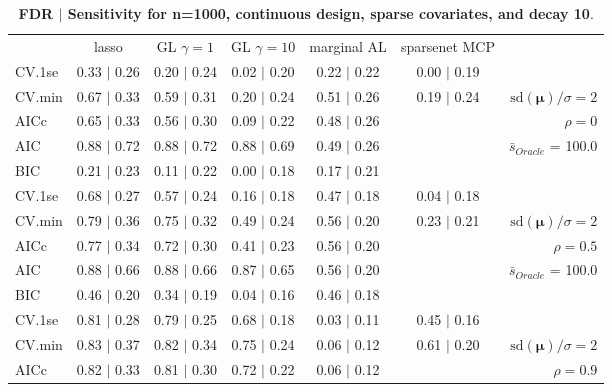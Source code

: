 \clearpage
\begin{table}\vspace{-.5cm}
\caption[l]{ {\it }
{ \bf FDR $\boldsymbol{\mid}$ Sensitivity for n=1000, continuous design, sparse covariates, and  decay  10}.}
\vspace{-.5cm}
\footnotesize{}
\begin{center}
\begin{tabular}{l*{5}{c}|r}
 & lasso & GL $\gamma=1$ & GL $\gamma=10$ & marginal AL & sparsenet MCP  & \\
 \cline{1-7}
CV.1se & 0.33 $\mid$ 0.26 & 0.20 $\mid$ 0.24 & 0.02 $\mid$ 0.20 & 0.22 $\mid$ 0.22 & 0.00 $\mid$ 0.19 & \\
CV.min & 0.67 $\mid$ 0.33 & 0.59 $\mid$ 0.31 & 0.20 $\mid$ 0.24 & 0.51 $\mid$ 0.26 & 0.19 $\mid$ 0.24 &  $\mathrm{sd}(\mathbf{\mu})/\sigma=2$ \\
AICc & 0.65 $\mid$ 0.33 & 0.56 $\mid$ 0.30 & 0.09 $\mid$ 0.22 & 0.48 $\mid$ 0.26 & & $\rho=0$ \\
AIC & 0.88 $\mid$ 0.72 & 0.88 $\mid$ 0.72 & 0.88 $\mid$ 0.69 & 0.49 $\mid$ 0.26 & &  \multirow{2}{*}{$\bar{s}_{Oracle}$ = 100.0} \\
BIC & 0.21 $\mid$ 0.23 & 0.11 $\mid$ 0.22 & 0.00 $\mid$ 0.18 & 0.17 $\mid$ 0.21 & &  \\
 \hline 
CV.1se & 0.68 $\mid$ 0.27 & 0.57 $\mid$ 0.24 & 0.16 $\mid$ 0.18 & 0.47 $\mid$ 0.18 & 0.04 $\mid$ 0.18 & \\
CV.min & 0.79 $\mid$ 0.36 & 0.75 $\mid$ 0.32 & 0.49 $\mid$ 0.24 & 0.56 $\mid$ 0.20 & 0.23 $\mid$ 0.21 &  $\mathrm{sd}(\mathbf{\mu})/\sigma=2$ \\
AICc & 0.77 $\mid$ 0.34 & 0.72 $\mid$ 0.30 & 0.41 $\mid$ 0.23 & 0.56 $\mid$ 0.20 & & $\rho=0.5$ \\
AIC & 0.88 $\mid$ 0.66 & 0.88 $\mid$ 0.66 & 0.87 $\mid$ 0.65 & 0.56 $\mid$ 0.20 & &  \multirow{2}{*}{$\bar{s}_{Oracle}$ = 100.0} \\
BIC & 0.46 $\mid$ 0.20 & 0.34 $\mid$ 0.19 & 0.04 $\mid$ 0.16 & 0.46 $\mid$ 0.18 & &  \\
 \hline 
CV.1se & 0.81 $\mid$ 0.28 & 0.79 $\mid$ 0.25 & 0.68 $\mid$ 0.18 & 0.03 $\mid$ 0.11 & 0.45 $\mid$ 0.16 & \\
CV.min & 0.83 $\mid$ 0.37 & 0.82 $\mid$ 0.34 & 0.75 $\mid$ 0.24 & 0.06 $\mid$ 0.12 & 0.61 $\mid$ 0.20 &  $\mathrm{sd}(\mathbf{\mu})/\sigma=2$ \\
AICc & 0.82 $\mid$ 0.33 & 0.81 $\mid$ 0.30 & 0.72 $\mid$ 0.22 & 0.06 $\mid$ 0.12 & & $\rho=0.9$ \\

\end{tabular}
\end{center}
\end{table}
